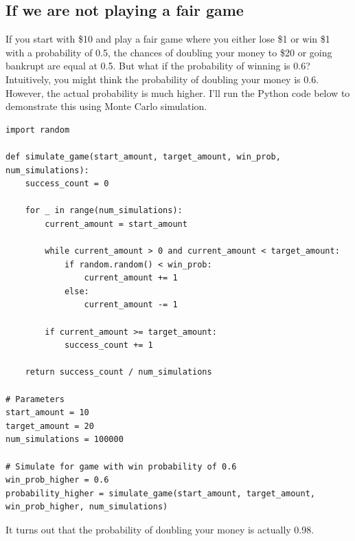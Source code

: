 \documentclass{article}
\begin{document}
\subsection{If we are not playing a fair game}
If you start with \$10 and play a fair game where you either lose \$1 or win \$1 with a probability of 0.5, the chances of doubling your money to \$20 or going bankrupt are equal at 0.5. But what if the probability of winning is 0.6? Intuitively, you might think the probability of doubling your money is 0.6. However, the actual probability is much higher. I’ll run the Python code below to demonstrate this using Monte Carlo simulation.
\begin{verbatim}
import random

def simulate_game(start_amount, target_amount, win_prob, num_simulations):
    success_count = 0
    
    for _ in range(num_simulations):
        current_amount = start_amount
        
        while current_amount > 0 and current_amount < target_amount:
            if random.random() < win_prob:
                current_amount += 1
            else:
                current_amount -= 1
        
        if current_amount >= target_amount:
            success_count += 1
    
    return success_count / num_simulations

# Parameters
start_amount = 10
target_amount = 20
num_simulations = 100000

# Simulate for game with win probability of 0.6
win_prob_higher = 0.6
probability_higher = simulate_game(start_amount, target_amount, win_prob_higher, num_simulations)
\end{verbatim}

 It turns out that the probability of doubling your money is actually 0.98.
\end{document}
